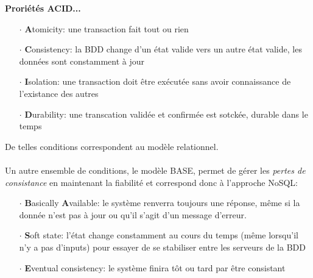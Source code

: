 \item{}
{\faux}
{\textbf{Proriétés ACID...}
\begin{itemize}\setlength{\itemsep}{.3em}
\item[$\cdot$]\textbf{A}tomicity: une transaction fait tout ou rien
\item[$\cdot$]\textbf{C}onsistency: la BDD change d'un état valide vers un autre état valide, les données sont constamment à jour
\item[$\cdot$]\textbf{I}solation: une transaction doit être exécutée sans avoir connaissance de l'existance des autres
\item[$\cdot$]\textbf{D}urability: une transcation validée et confirmée est sotckée, durable dans le temps
\end{itemize}

De telles conditions correspondent au modèle relationnel.
\paragraph{}
Un autre ensemble de conditions, le modèle BASE, permet de gérer les \textit{pertes de consistance} en maintenant la fiabilité et correspond donc à l'approche NoSQL:
\begin{itemize}\setlength{\itemsep}{.3em}
\item[$\cdot$]\textbf{B}asically \textbf{A}vailable: le système renverra toujours une réponse, même si la donnée n'est pas à jour ou qu'il s'agit d'un message d'erreur.
\item[$\cdot$]\textbf{S}oft state: l'état change constamment au cours du temps (même lorsqu'il n'y a pas d'inputs) pour essayer de se stabiliser entre les serveurs de la BDD
\item[$\cdot$]\textbf{E}ventual consistency: le système finira tôt ou tard par être consistant
\end{itemize}
}